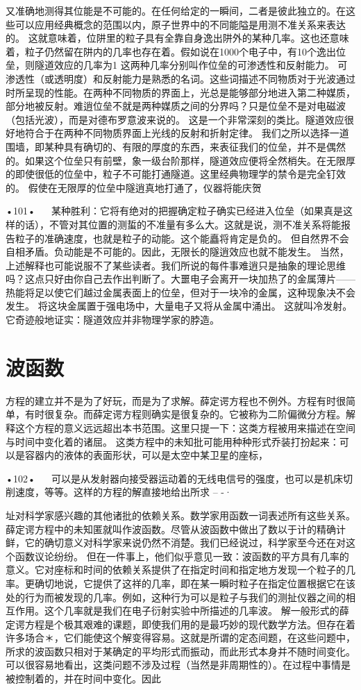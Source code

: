 又准确地测得其位能是不可能的。在任何给定的一瞬间，二者是彼此独立的。在这些可以应用经典概念的范围以内，原子世界中的不同能隘是用测不准关系来表达的。
这就意味着，位阱里的粒子具有全靠自身逸出阱外的某种几率。这也还意味着，粒子仍然留在阱内的几率也存在着。假如说在1000个电子中，有10个逸出位垒，则隧道效应的几率为1%
这两种几率分别叫作位垒的可渗透性和反射能力。
可渗透性（或透明度）和反射能力是熟悉的名词。这些词描述不同物质对于光波通过时所呈现的性能。在两种不同物质的界面上，光总是能够部分地进入第二种媒质，部分地被反射。难逍位垒不就是两种媒质之间的分界吗？只是位垒不是对电磁波（包括光波），而是对德布罗意波来说的。
这是一个非常深刻的类比。隧道效应很好地符合于在两种不同物质界面上光线的反射和折射定律。
我们之所以选择一道围墙，即某种具有确切的、有限的厚度的东西，来表征我们的位垒，并不是偶然的。如果这个位垒只有前壁，象一级台阶那样，隧道效应便将全然梢失。在无限厚的即使很低的位垒中，粒子不可能打通隧道。这里经典物理学的禁令是完全钉效的。
假使在无限厚的位垒中隧逍真地打通了，仪器将能庆贺

•101•
  
某种胜利：它将有绝对的把握确定粒子确实已经进入位垒（如果真是这样的话），不管对其位置的测蜇的不准量有多么大。这就是说，测不准关系将能报告粒子的准确速度，也就是粒子的动能。这个能矗将肯定是负的。
但自然界不会自相矛盾。负动能是不可能的。因此，无限长的隧逍效应也就不能发生。
当然，上述解释也可能说服不了某些读者。我们所说的每件事难逍只是抽象的理论思维吗？这点只好由你自己去作出判断了。大噩电子会离开一块加热了的金属薄片——热能将足以使它们越过金属表面上的位垒，但对于一块冷的金属，这种现象决不会发生。
将这块金属置于强电场中，大量电子又将从金属中涌出。
这就叫冷发射。它奇迹般地证实：隧道效应并非物理学家的脖造。

\section{波函数}
方程的建立并不是为了好玩，而是为了求解。薛定谔方程也不例外。方程有时很简单，有时很复杂。而薛定谔方程则确实是很复杂的。它被称为二阶偏微分方程。解释这个方程的意义远远超出本书范围。这里只提一下：这类方程被用来描述在空间与时间中变化着的诸屈。
这类方程中的未知批可能用种种形式乔装打扮起来：可以是容器内的液体的表面形状，可以是太空中某卫星的座标，

•102•
  
可以是从发射器向接受器运动着的无线电信号的强度，也可以是机床切削速度，等等。这样的方程的解直接地给出所求
	--	-·

址对科学家感兴趣的其他诸批的依赖关系。数学家用函数一词表述所有这些关系。
薛定谔方程中的未知匿就叫作波函数。尽管从波函数中做出了数以于计的精确计鲜，它的确切意义对科学家来说仍然不消楚。我们已经说过，科学家至今还在对这个函数议论纷纷。
但在一件事上，他们似乎意见一致：波函数的平方具有几率的意义。它对座标和时间的依赖关系提供了在指定时间和指定地方发现一个粒子的几率。更确切地说，它提供了这祥的几率，即在某一瞬时粒子在指定位置根据它在该处的行为而被发现的几率。例如，这种行为可以是粒子与我们的测扯仪器之间的相互作用。这个几率就是我们在电子衍射实验中所描述的几率波。
解一般形式的薛定谔方程是个极其艰难的课题，即使我们用的是最巧妙的现代数学方法。但存在着许多场合＊，它们能使这个解变得容易。这就是所谓的定态间题，在这些问题中，所求的波函数只相对于某确定的平均形式而振动，而此形式本身并不随时间变化。
可以很容易地看出，这类问题不涉及过程（当然是非周期性的）。在过程中事情是被控制着的，并在时间中变化。因此

